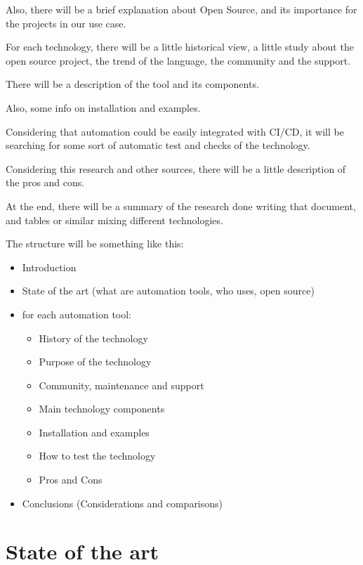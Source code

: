 \documentclass[12pt,a4paper,openright,twoside]{book}
\begin{document}
Also, there will be a brief explanation about Open Source, and its importance for the projects in our use case.


For each technology, there will be a little historical view, a little study about the open source project, the trend of the language, the community and the support.


There will be a description of the tool and its components.


Also, some info on installation and examples.


Considering that automation could be easily integrated with CI/CD, it will be searching for some sort of automatic test and checks of the technology.


Considering this research and other sources, there will be a little description of the pros and cons.


At the end, there will be a summary of the research done writing that document, and tables or similar mixing different technologies.

The structure will be something like this:

\begin{itemize}
    \item Introduction
    \item State of the art (what are automation tools, who uses, open source)
    \item for each automation tool:
    \begin{itemize}
    \item History of the technology
    \item Purpose of the technology
    \item Community, maintenance and support
    \item Main technology components
    \item Installation and examples
    \item How to test the technology
    \item Pros and Cons
    \end{itemize}
    \item Conclusions (Considerations and comparisons)
\end{itemize}


\chapter{State of the art}
\end{document}
